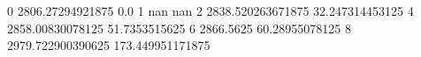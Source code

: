 0 2806.27294921875 0.0
1 nan nan
2 2838.520263671875 32.247314453125
4 2858.00830078125 51.7353515625
6 2866.5625 60.28955078125
8 2979.722900390625 173.449951171875
